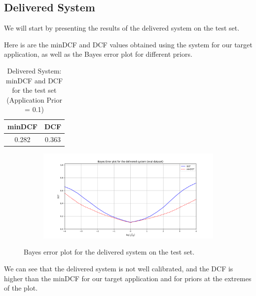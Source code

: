 \documentclass[12pt]{report}
\newcommand{\nl}{%
    \newline
    \noindent
}
\begin{document}
\subsection*{Delivered System}
We will start by presenting the results of the delivered system on the test set.
\nl
Here is are the minDCF and DCF values obtained using the system for our target application, as well as the Bayes error plot for different priors.

\begin{table}[H]
    \centering
    \begin{tabular}{|c|c|}
        \hline
        \rowcolor{blue!10}
        \textbf{minDCF} & \textbf{DCF} \\
        \hline
        0.282           & 0.363        \\
        \hline
    \end{tabular}
    \caption{Delivered System: minDCF and DCF for the test set (Application Prior = 0.1)}
    \label{tab:Delivered_System}
\end{table}

\begin{figure}[H]
    \centering
    \begin{subfigure}[t]{0.6\textwidth}
        \includegraphics[width=\textwidth]{./plot/eval/delivered.png}
    \end{subfigure}
    \caption{Bayes error plot for the delivered system on the test set.}
    \label{fig:Delivered_System}
\end{figure}
\noindent
We can see that the delivered system is not well calibrated, and the DCF is higher than the minDCF for our target application and for priors at the extremes of the plot.
\end{document}
